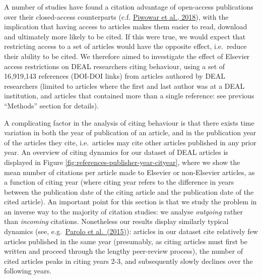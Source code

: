 \documentclass[
]{article}
\begin{document}
A number of studies have found a citation advantage of open-access publications over their closed-access counterparts (c.f. \href{https://doi.org/10.7717/peerj.4375}{Piwowar et al., 2018}), with the implication that having access to articles makes them easier to read, download and ultimately more likely to be cited. If this were true, we would expect that restricting access to a set of articles would have the opposite effect, i.e.~reduce their ability to be cited. We therefore aimed to investigate the effect of Elsevier access restrictions on DEAL researchers citing behaviour, using a set of 16,919,143 references (DOI-DOI links) from articles authored by DEAL researchers (limited to articles where the first and last author was at a DEAL institution, and articles that contained more than a single reference: see previous ``Methods'' section for details).

A complicating factor in the analysis of citing behaviour is that there exists time variation in both the year of publication of an article, and in the publication year of the articles they cite, i.e.~articles may cite other articles published in any prior year. An overview of citing dynamics for our dataset of DEAL articles is displayed in Figure \ref{fig:references-publisher-year-cityear}, where we show the mean number of citations per article made to Elsevier or non-Elsevier articles, as a function of citing year (where citing year refers to the difference in years between the publication date of the citing article and the publication date of the cited article). An important point for this section is that we study the problem in an inverse way to the majority of citation studies: we analyse \emph{outgoing} rather than \emph{incoming} citations. Nonetheless our results display similarly typical dynamics (see, e.g.~\href{https://doi.org/10.1016/j.joi.2015.07.006}{Parolo et al.~(2015)}): articles in our dataset cite relatively few articles published in the same year (presumably, as citing articles must first be written and proceed through the lengthy peer-review process), the number of cited articles peaks in citing years 2-3, and subsequently slowly declines over the following years.
\end{document}
